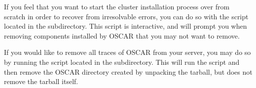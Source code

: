 If you feel that you want to start the cluster installation process
over from scratch in order to recover from irresolvable errors, you
can do so with the  script located in the
 subdirectory. This script is interactive, and will
prompt you when removing components installed by OSCAR that you may
not want to remove.

If you would like to remove all traces of OSCAR from your server, you
may do so by running the  script located in the
 subdirectory. This will run the 
script and then remove the OSCAR directory created by unpacking the
tarball, but does not remove the tarball itself.


